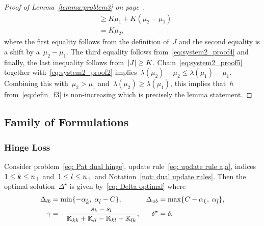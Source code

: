 \begin{proof}[Proof of Lemma~\ref{lemma:problem3} on page~\pageref{lemma:problem3}]
\begin{equation}
\begin{aligned}
        & \ge K\mu_1 + K(\mu_2 - \mu_1) \\
        & = K\mu_2,
    \end{aligned}
  \end{equation}
  where the first equality follows from the definition of~$J$ and the second equality is a shift by a~$\mu_2- \mu_1.$ The third equality follows from~\eqref{eq:system2_proof4} and finally, the last inequality follows from~$|J| \ge K$. Chain~\eqref{eq:system2_proof5} together with~\eqref{eq:system2_proof2} implies~$\lambda(\mu_2) - \mu_2 \le \lambda(\mu_1)- \mu_1$. Combining this with~$\mu_2 > \mu_1$ and~$\lambda(\mu_2) \ge \lambda(\mu_1)$, this implies that~$h$ from~\eqref{eq:defin_f3} is non-increasing which is precisely the lemma statement.
\end{proof}

\subsection{Family of \PatMat Formulations}

\subsubsection{Hinge Loss}

\begin{lemma}
  Consider problem~\eqref{eq: Pat dual hinge}, update rule~\eqref{eq: update rule a,a}, indices~$1 \leq k \leq n_{+}$ and~$1 \leq l \leq n_{+}$  and Notation~\ref{not: dual update rules}. Then the optimal solution~$\Delta^{\star}$ is given by~\eqref{eq: Delta optimal} where
  \begin{align*}
    \Delta_{lb} & = \min\{- \alpha_{\hat{k}},\; \alpha_{\hat{l}} - C\}, &
    \Delta_{ub} & = \max\{C - \alpha_{\hat{k}},\; \alpha_{\hat{l}}\}, \\
    \gamma & = -\frac{s_k - s_l}{\mathbb{K}_{kk} + \mathbb{K}_{ll} - \mathbb{K}_{kl} - \mathbb{K}_{lk}}, &
    \delta^{\star} & = \delta.
  \end{align*}
\end{lemma}

